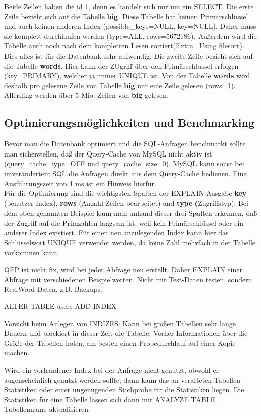 Beide Zeilen haben die id 1, denn es handelt sich nur um ein SELECT. Die erste Zeile bezieht sich auf die Tabelle \textbf{big}. Diese Tabelle hat keinen Primärschlüssel und auch keinen anderen Index (possible\_keys=NULL, key=NULL). Daher muss sie komplett durchlaufen werden (type=ALL, rows=5672186). Außerdem wird die Tabelle auch noch nach dem kompletten Lesen sortiert(Extra=Using filesort). Dies alles ist für die Datenbank sehr aufwendig. Die zweite Zeile bezieht sich auf die Tabelle \textbf{words}. Hier kann der ZUgriff über den Primärschlussel erfolgen (key=PRIMARY), welcher ja immer UNIQUE ist. Von der Tabelle \textbf{words} wird deshalb pro gelesene Zeile von Tabelle \textbf{big} nur eine Zeile gelesen (rows=1). Allerding werden über 5 Mio. Zeilen von \textbf{big} gelesen.

\subsection{Optimierungsmöglichkeiten und Benchmarking}
Bevor man die Datenbank optimiert und die SQL-Anfragen benchmarkt sollte man sicherstellen,
daß der Query-Cache von MySQL nicht aktiv ist (query\_cache\_type=OFF und query\_cache\_size=0). MySQL kann sonst bei unverändertem SQL die Anfragen direkt aus dem Query-Cache bedienen. Eine Ausführungszeit von 1 ms ist ein Hinweis hierfür.\\
Für die Optimierung sind die wichtigsten Spalten der EXPLAIN-Ausgabe \textbf{key} (benutzer Index), \textbf{rows} (Anzahl Zeilen bearbeitet) und \textbf{type} (Zugriffstyp).
Bei dem oben genannten Beispiel kann man anhand dieser drei Spalten erkennen, daß der Zugriff auf die Primzahlen langsam ist, weil kein Primärschlüssel oder ein anderer Index existiert.
Für einen neu anzulegenden Index kann hier das Schlüsselwort UNIQUE verwendet werden, da keine Zahl mehrfach in der Tabelle vorkommen kann:


QEP ist nicht fix, wird bei jeder Abfrage neu erstellt. Daher EXPLAIN einer Abfrage mit verschiedenen Beispielwerten.
Nicht mit Test-Daten testen, sondern RealWord-Daten, z.B. Backups.

ALTER TABLE users ADD INDEX

Vorsicht beim Anlegen von INDIZES: Kann bei großen Tabellen sehr lange Dauern und blockiert in dieser Zeit die Tabelle.
Vorher Informationen über die Größe der Tabellen holen, am besten einen Probedurchlauf auf einer Kopie machen.

Wird ein vorhandener Index bei der Anfrage nicht genutzt, obwohl er augenscheinlich genutzt werden sollte, dann kann das an veralteten Tabellen-Statistiken oder einer ungenügenden Stichprobe für die Statistiken liegen. Die Statistiken für eine Tabelle lassen sich dann mit ANALYZE TABLE Tabellenname aktualisieren.

